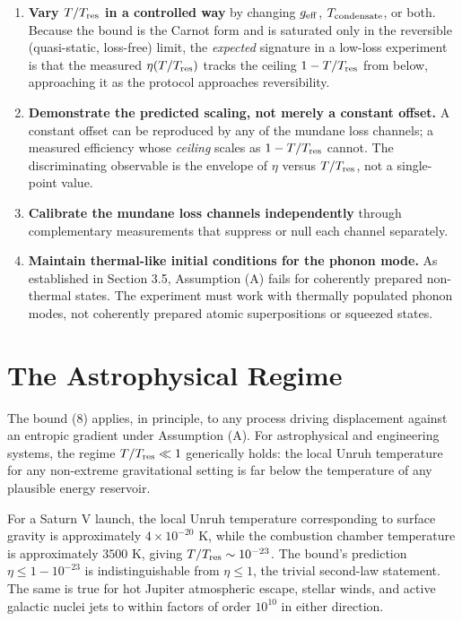 \documentclass[11pt]{article}
\providecommand{\tightlist}{\setlength{\itemsep}{2pt}\setlength{\parskip}{0pt}}
\begin{document}
\begin{enumerate}
\def\labelenumi{\arabic{enumi}.}
\tightlist
\item
  \textbf{Vary \(T/T_{\rm res}\) in a controlled way} by changing \(g_{\rm eff}\), \(T_{\rm condensate}\), or both. Because the bound is the Carnot form and is saturated only in the reversible (quasi-static, loss-free) limit, the \emph{expected} signature in a low-loss experiment is that the measured \(\eta(T/T_{\rm res})\) tracks the ceiling \(1 - T/T_{\rm res}\) from below, approaching it as the protocol approaches reversibility.
\item
  \textbf{Demonstrate the predicted scaling, not merely a constant offset.} A constant offset can be reproduced by any of the mundane loss channels; a measured efficiency whose \emph{ceiling} scales as \(1 - T/T_{\rm res}\) cannot. The discriminating observable is the envelope of \(\eta\) versus \(T/T_{\rm res}\), not a single-point value.
\item
  \textbf{Calibrate the mundane loss channels independently} through complementary measurements that suppress or null each channel separately.
\item
  \textbf{Maintain thermal-like initial conditions for the phonon mode.} As established in Section 3.5, Assumption (A) fails for coherently prepared non-thermal states. The experiment must work with thermally populated phonon modes, not coherently prepared atomic superpositions or squeezed states.
\end{enumerate}

\section{The Astrophysical Regime}\label{the-astrophysical-regime}

The bound (8) applies, in principle, to any process driving displacement against an entropic gradient under Assumption (A). For astrophysical and engineering systems, the regime \(T/T_{\rm res} \ll 1\) generically holds: the local Unruh temperature for any non-extreme gravitational setting is far below the temperature of any plausible energy reservoir.

For a Saturn V launch, the local Unruh temperature corresponding to surface gravity is approximately \(4 \times 10^{-20}\) K, while the combustion chamber temperature is approximately \(3500\) K, giving \(T/T_{\rm res} \sim 10^{-23}\). The bound's prediction \(\eta \leq 1 - 10^{-23}\) is indistinguishable from \(\eta \leq 1\), the trivial second-law statement. The same is true for hot Jupiter atmospheric escape, stellar winds, and active galactic nuclei jets to within factors of order \(10^{10}\) in either direction.
\end{document}
